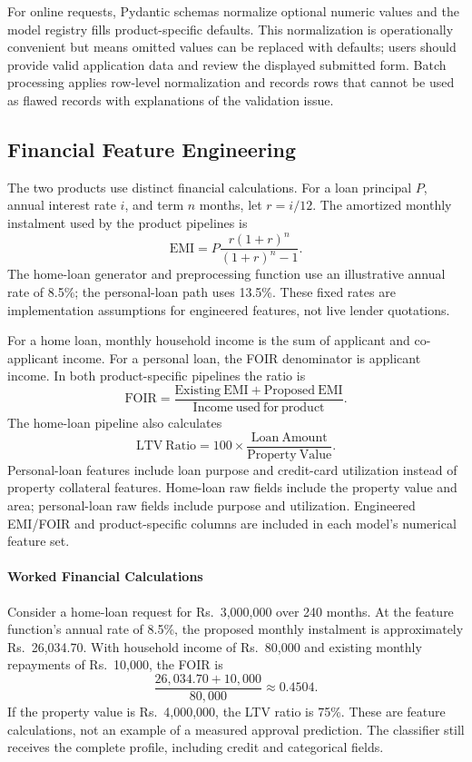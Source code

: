 For online requests, Pydantic schemas normalize optional numeric values and the model registry fills product-specific defaults. This normalization is operationally convenient but means omitted values can be replaced with defaults; users should provide valid application data and review the displayed submitted form. Batch processing applies row-level normalization and records rows that cannot be used as flawed records with explanations of the validation issue.

\subsection{Financial Feature Engineering}
The two products use distinct financial calculations. For a loan principal $P$, annual interest rate $i$, and term $n$ months, let $r=i/12$. The amortized monthly instalment used by the product pipelines is
\begin{equation}
  \mathrm{EMI}=P\frac{r(1+r)^n}{(1+r)^n-1}.
  \label{eq:emi}
\end{equation}
The home-loan generator and preprocessing function use an illustrative annual rate of 8.5\%; the personal-loan path uses 13.5\%. These fixed rates are implementation assumptions for engineered features, not live lender quotations.

For a home loan, monthly household income is the sum of applicant and co-applicant income. For a personal loan, the FOIR denominator is applicant income. In both product-specific pipelines the ratio is
\begin{equation}
  \mathrm{FOIR}=\frac{\mathrm{Existing\ EMI}+\mathrm{Proposed\ EMI}}{\mathrm{Income\ used\ for\ product}}.
  \label{eq:foir}
\end{equation}
The home-loan pipeline also calculates
\begin{equation}
  \mathrm{LTV\ Ratio}=100\times\frac{\mathrm{Loan\ Amount}}{\mathrm{Property\ Value}}.
  \label{eq:ltv}
\end{equation}
Personal-loan features include loan purpose and credit-card utilization instead of property collateral features. Home-loan raw fields include the property value and area; personal-loan raw fields include purpose and utilization. Engineered EMI/FOIR and product-specific columns are included in each model's numerical feature set.

\paragraph*{Worked Financial Calculations}
Consider a home-loan request for Rs.~3,000,000 over 240 months. At the feature function's annual rate of 8.5\%, the proposed monthly instalment is approximately Rs.~26,034.70. With household income of Rs.~80,000 and existing monthly repayments of Rs.~10,000, the FOIR is
\[
\frac{26,034.70+10,000}{80,000}\approx 0.4504.
\]
If the property value is Rs.~4,000,000, the LTV ratio is 75\%. These are feature calculations, not an example of a measured approval prediction. The classifier still receives the complete profile, including credit and categorical fields.


